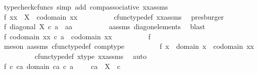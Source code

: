 \begin{isabellebody}
\ {\isacharparenleft}{\kern0pt}typecheck{\isacharunderscore}{\kern0pt}cfuncs{\isacharcomma}{\kern0pt}\ simp\ add{\isacharcolon}{\kern0pt}\ comp{\isacharunderscore}{\kern0pt}associative{}\ xx{\isacharunderscore}{\kern0pt}assms{\isacharparenleft}{\kern0pt}{}{\isacharparenright}{\kern0pt}{\isacharparenright}{\kern0pt}\isanewline
\ \ \ \ \ \ \isamarkupfalse%
\isanewline
\ \ \ \ \ \ \isamarkupfalse%
\ f{}{\isacharcolon}{\kern0pt}\ {\isachardoublequoteopen}xx\ {\isacharcolon}{\kern0pt}\ X\ {\isasymrightarrow}\ codomain\ xx{\isachardoublequoteclose}\isanewline
\ \ \ \ \ \ \ \ \isamarkupfalse%
\ cfunc{\isacharunderscore}{\kern0pt}type{\isacharunderscore}{\kern0pt}def\ xx{\isacharunderscore}{\kern0pt}assms\ \isamarkupfalse%
\ presburger\isanewline
\ \ \ \ \ \ \isamarkupfalse%
\ f{}{\isacharcolon}{\kern0pt}\ {\isachardoublequoteopen}diagonal\ X\ {\isasymcirc}\isactrlsub c\ a\ {\isacharequal}{\kern0pt}\ {\isasymlangle}a{\isacharcomma}{\kern0pt}a{\isasymrangle}{\isachardoublequoteclose}\isanewline
\ \ \ \ \ \ \ \ \isamarkupfalse%
\ a{\isacharunderscore}{\kern0pt}assms\ diag{\isacharunderscore}{\kern0pt}on{\isacharunderscore}{\kern0pt}elements\ \isamarkupfalse%
\ blast\isanewline
\ \ \ \ \ \ \isamarkupfalse%
\ f{}{\isacharcolon}{\kern0pt}\ {\isachardoublequoteopen}codomain\ {\isacharparenleft}{\kern0pt}xx\ {\isasymcirc}\isactrlsub c\ a{\isacharparenright}{\kern0pt}\ {\isacharequal}{\kern0pt}\ codomain\ xx{\isachardoublequoteclose}\isanewline
\ \ \ \ \ \ \ \ \isamarkupfalse%
\ f{}\ \isamarkupfalse%
\ {\isacharparenleft}{\kern0pt}meson\ a{\isacharunderscore}{\kern0pt}assms\ cfunc{\isacharunderscore}{\kern0pt}type{\isacharunderscore}{\kern0pt}def\ comp{\isacharunderscore}{\kern0pt}type{\isacharparenright}{\kern0pt}\isanewline
\ \ \ \ \ \ \isamarkupfalse%
\ \isamarkupfalse%
\ f{}{\isacharcolon}{\kern0pt}\ {\isachardoublequoteopen}x\ {\isacharcolon}{\kern0pt}\ domain\ x\ {\isasymrightarrow}\ codomain\ xx{\isachardoublequoteclose}\isanewline
\ \ \ \ \ \ \ \ \isamarkupfalse%
\ cfunc{\isacharunderscore}{\kern0pt}type{\isacharunderscore}{\kern0pt}def\ x{\isacharunderscore}{\kern0pt}type\ xx{\isacharunderscore}{\kern0pt}assms\ \isamarkupfalse%
\ auto\isanewline
\ \ \ \ \ \ \isamarkupfalse%
\ f{}{}{\isacharcolon}{\kern0pt}\ {\isachardoublequoteopen}{\isasymforall}c\ ca{\isachardot}{\kern0pt}\ domain\ {\isacharparenleft}{\kern0pt}ca\ {\isasymcirc}\isactrlsub c\ a{\isacharparenright}{\kern0pt}\ {\isacharequal}{\kern0pt}\ {\isasymone}\ {\isasymor}\ {\isasymnot}\ ca\ {\isacharcolon}{\kern0pt}\ X\ {\isasymrightarrow}\ c{\isachardoublequoteclose}\isanewline

\end{isabellebody}
